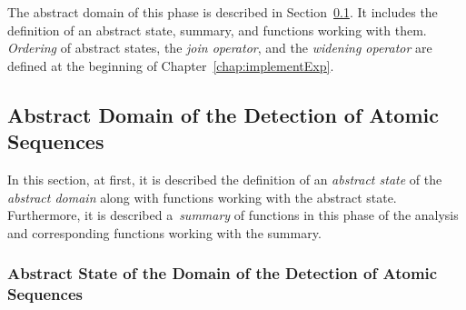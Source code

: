 The abstract domain of this phase is described in
Section~\ref{sec:implementPhase1Domain}. It includes the definition of
an abstract state, summary, and functions working with them.
\emph{Ordering} of abstract states, the \emph{join operator}, and
the \emph{widening operator} are defined at the beginning of
Chapter~\ref{chap:implementExp}.


\subsection{Abstract Domain of the Detection of Atomic Sequences}
\label{sec:implementPhase1Domain}

In this section, at first, it is described the definition of an
\emph{abstract state} of the \emph{abstract domain} along with functions
working with the abstract state. Furthermore, it is described
a~\emph{summary} of functions in this phase of the analysis and
corresponding functions working with the summary.

\subsubsection{%
    Abstract State of the Domain of the Detection of Atomic Sequences
}

